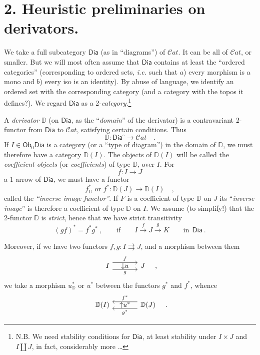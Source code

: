 \documentclass[11pt]{article}
\newcommand{\printedpage}[1]{\marginpar{\footnotesize p.~#1}}
\newcommand{\msp}[1]{\marginpar{\footnotesize [#1]}}
\newcommand{\Dia}{\mathsf{Dia}}
\newcommand{\Cat}{\mathcal{C}\mathit{at}}
\newcommand{\DD}{\mathbb{D}}
\newcommand{\Ob}{\mathsf{Ob}}
\begin{document}
\printedpage{4}

\msp{page 4}

\section*{2. Heuristic preliminaries on derivators.}

We take a full subcategory $\Dia$ (as in ``diagrams'') of $\Cat$. It can be all of $\Cat$, or smaller. But we will most often assume that $\Dia$ contains at least the ``ordered categories'' (corresponding to ordered sets, \textit{i.e.} such that $a$) every morphism is a mono and $b$) every iso is an identity). By abuse of language, we identify an ordered set with the corresponding category (and a category with the topos it defines?). We regard $\Dia$ as a 2-\textit{category}.\footnote{N.B. We need stability conditions for $\Dia$, at least stability under $I \times J$ and $I \amalg J$, in fact, considerably more \dots}

A \textit{derivator} $\DD$ (on $\Dia$, as the ``\textit{domain}'' of the derivator) is a contravariant 2-functor from $\Dia$ to $\Cat$, satisfying certain conditions. Thus
\[ \DD : \Dia^{\circ} \longrightarrow \Cat \quad . \]
If $I \in \Ob_0 \Dia$ is a category (or a ``type of diagram'') in the domain of $\DD$, we must therefore have a category $\DD(I)$. The objects of $\DD(I)$ will be called the \textit{coefficient-objects} (or \textit{coefficients}) of type $\DD$, over $I$. For
\[ f : I \longrightarrow J \]
a 1-arrow of $\Dia$, we must have a functor
\[ f^*_{\DD} \text{ or } f^* : \DD(J) \longrightarrow \DD(I) \quad , \]
called the \textit{``inverse image functor''}. If $F$ is a coefficient of type $\DD$ on $J$ its ``\textit{inverse image}'' is therefore a coefficient of type $\DD$ on $I$. We assume (to simplify!) that the 2-functor $\DD$ is \textit{strict}, hence that we have strict transitivity
\[ (gf)^* = f^*g^* \ , \qquad \text{if} \qquad I \xrightarrow{f} J \xrightarrow{g} K \qquad \text{in} \ \ \Dia \ . \]

\msp{page 5}

Moreover, if we have two functors $f, g : I \rightrightarrows J$, and a morphism between them
\[
\begin{tikzcd}[column sep=large]
I \arrow[r, shift left=2, "f"] \arrow[r, shift right=2, "g"'] \arrow[r, phantom, "{\downarrow}u"] & J
\end{tikzcd}
\quad ,
\]
we take a morphism $u^*_{\DD}$ or $u^*$ between the functors $g^*$ and $f^*$, whence
\[
\begin{tikzcd}[column sep=large]
\DD(I) & \DD(J) \arrow[l, shift right=2, "f^*"'] \arrow[l, shift left=2, "g^*"] \arrow[l, phantom, "{\uparrow}u^*"]
\end{tikzcd}
\quad .
\]
\end{document}
